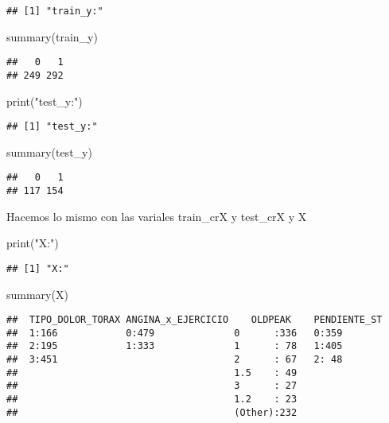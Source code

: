 \documentclass[
]{article}
\newenvironment{Shaded}{\begin{snugshade}}{\end{snugshade}}
\newcommand{\FunctionTok}[1]{\textcolor[rgb]{0.94,0.94,0.56}{#1}}
\newcommand{\NormalTok}[1]{\textcolor[rgb]{0.80,0.80,0.80}{#1}}
\newcommand{\StringTok}[1]{\textcolor[rgb]{0.80,0.58,0.58}{#1}}
\begin{document}
\begin{verbatim}
## [1] "train_y:"
\end{verbatim}

\begin{Shaded}
\begin{Highlighting}[]
\FunctionTok{summary}\NormalTok{(train\_y)}
\end{Highlighting}
\end{Shaded}

\begin{verbatim}
##   0   1 
## 249 292
\end{verbatim}

\begin{Shaded}
\begin{Highlighting}[]
\FunctionTok{print}\NormalTok{(}\StringTok{"test\_y:"}\NormalTok{)}
\end{Highlighting}
\end{Shaded}

\begin{verbatim}
## [1] "test_y:"
\end{verbatim}

\begin{Shaded}
\begin{Highlighting}[]
\FunctionTok{summary}\NormalTok{(test\_y)}
\end{Highlighting}
\end{Shaded}

\begin{verbatim}
##   0   1 
## 117 154
\end{verbatim}

Hacemos lo mismo con las variales train\_crX y test\_crX y X

\begin{Shaded}
\begin{Highlighting}[]
\FunctionTok{print}\NormalTok{(}\StringTok{"X:"}\NormalTok{)}
\end{Highlighting}
\end{Shaded}

\begin{verbatim}
## [1] "X:"
\end{verbatim}

\begin{Shaded}
\begin{Highlighting}[]
\FunctionTok{summary}\NormalTok{(X)}
\end{Highlighting}
\end{Shaded}

\begin{verbatim}
##  TIPO_DOLOR_TORAX ANGINA_x_EJERCICIO    OLDPEAK    PENDIENTE_ST
##  1:166            0:479              0      :336   0:359       
##  2:195            1:333              1      : 78   1:405       
##  3:451                               2      : 67   2: 48       
##                                      1.5    : 49               
##                                      3      : 27               
##                                      1.2    : 23               
##                                      (Other):232
\end{verbatim}
\end{document}
